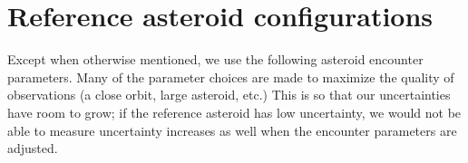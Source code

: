 \documentclass[fleqn,usenatbib]{mnras}
\begin{document}






\appendix

\section{Reference asteroid configurations}
\label{app:reference-configs}

Except when otherwise mentioned, we use the following asteroid encounter parameters. Many of the parameter choices are made to maximize the quality of observations (a close orbit, large asteroid, etc.) This is so that our uncertainties have room to grow; if the reference asteroid has low uncertainty, we would not be able to measure uncertainty increases as well when the encounter parameters are adjusted.
\end{document}
